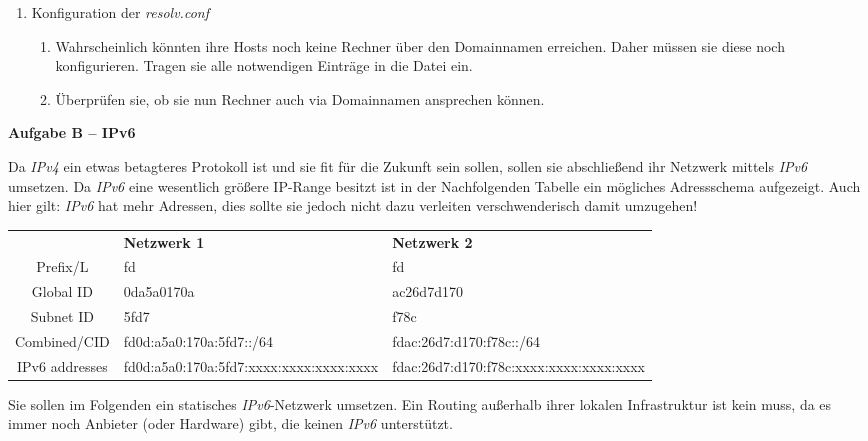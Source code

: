 \documentclass[paper=a4,fontsize=11pt]{scrartcl}%
\begin{document}
\begin{enumerate}
\begin{enumerate}
\begin{enumerate}
     	\end{enumerate}
	\end{enumerate}
	\item Konfiguration der \emph{resolv.conf}
	\begin{enumerate}
		\item Wahrscheinlich könnten ihre Hosts noch keine Rechner über den Domainnamen erreichen. Daher müssen sie diese noch konfigurieren. Tragen sie alle notwendigen Einträge in die Datei  ein.
		\item Überprüfen sie, ob sie nun Rechner auch via Domainnamen ansprechen können.
	\end{enumerate}
\end{enumerate}

\begin{center}\Large{\textbf{Aufgabe B -- IPv6}}\end{center}\vskip0.25in
Da \emph{IPv4} ein etwas betagteres Protokoll ist und sie fit für die Zukunft sein sollen, sollen sie abschließend ihr Netzwerk mittels \emph{IPv6} umsetzen. Da \emph{IPv6} eine wesentlich größere IP-Range besitzt ist in der Nachfolgenden Tabelle ein mögliches Adressschema aufgezeigt. Auch hier gilt: \emph{IPv6} hat mehr Adressen, dies sollte sie jedoch nicht dazu verleiten verschwenderisch damit umzugehen!
\begin{table}[H]
\centering
\begin{tabular}{cll}
 &\textbf{Netzwerk 1} & \textbf{Netzwerk 2} \\
 Prefix/L & fd & fd\\
 Global ID & 0da5a0170a & ac26d7d170\\
 Subnet ID &  5fd7 & f78c\\
 Combined/CID & fd0d:a5a0:170a:5fd7::/64 & fdac:26d7:d170:f78c::/64 \\
 IPv6 addresses & fd0d:a5a0:170a:5fd7:xxxx:xxxx:xxxx:xxxx & fdac:26d7:d170:f78c:xxxx:xxxx:xxxx:xxxx
\end{tabular}
\end{table}
Sie sollen im Folgenden ein statisches \emph{IPv6}-Netzwerk umsetzen. Ein Routing außerhalb ihrer lokalen Infrastruktur ist kein muss, da es immer noch Anbieter (oder Hardware) gibt, die keinen \emph{IPv6} unterstützt.
\end{document}
